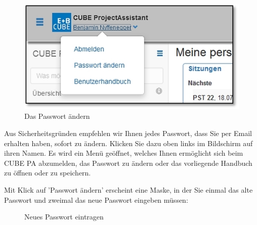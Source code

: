 \begin{figure}   %
  \vspace{-25pt}      %
  \begin{center}
    \includegraphics[width=1\linewidth]{../chapters/02_GettingStarted/pictures/2-4_Passwort_aendern.jpg}
  \end{center}
  \vspace{-20pt}
  \caption{Das Passwort ändern}
  \vspace{-10pt}
\end{figure}
Aus Sicherheitsgründen empfehlen wir Ihnen jedes Passwort, dass Sie per Email erhalten haben, sofort zu ändern. Klicken Sie dazu oben links im Bildschirm auf ihren Namen. Es wird ein Menü geöffnet, welches Ihnen ermöglicht sich beim CUBE PA abzumelden, das Passwort zu ändern oder das vorliegende Handbuch zu öffnen oder zu speichern.

\vspace{\baselineskip}

Mit Klick auf 'Passwort ändern' erscheint eine Maske, in der Sie einmal das alte Passwort und zweimal das neue Passwort eingeben müssen:

\begin{figure}[H]
\caption{Neues Passwort eintragen}
\end{figure}

